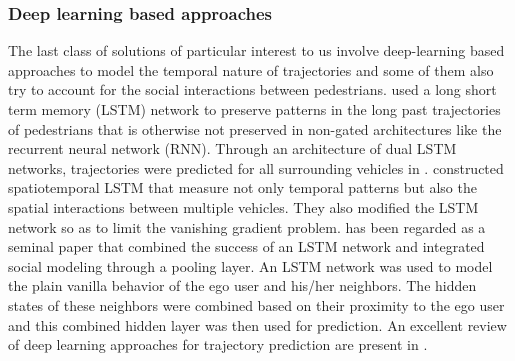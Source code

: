 \documentclass{article}
\begin{document}
\subsubsection{Deep learning based approaches}
The last class of solutions of particular interest to us involve deep-learning based approaches to model the temporal nature of trajectories and some of them also try to account for the social interactions between pedestrians. \cite{saleh_intent_2017} used a long short term memory (LSTM) network\cite{HochSchm97} to preserve patterns in the long past trajectories of pedestrians that is otherwise not preserved in non-gated architectures like the recurrent neural network (RNN)\cite{miikkulainen_simple_2010}. Through an architecture of dual LSTM networks, trajectories were predicted for all surrounding vehicles in \cite{xin_intention-aware_2019}. \cite{dai_modeling_2019} constructed spatiotemporal LSTM that measure not only temporal patterns but also the spatial interactions between multiple vehicles. They also modified the LSTM network so as to limit the vanishing gradient problem.  \cite{alahi_social_2016} has been regarded as a seminal paper that combined the success of an LSTM network and integrated social modeling through a pooling layer. An LSTM network was used to model the plain vanilla behavior of the ego user and his/her neighbors. The hidden states of these neighbors were combined based on their proximity to the ego user and this combined hidden layer was then used for prediction. An excellent review of deep learning approaches for trajectory prediction are present in \cite{sighencea_review_2021}.
\end{document}
